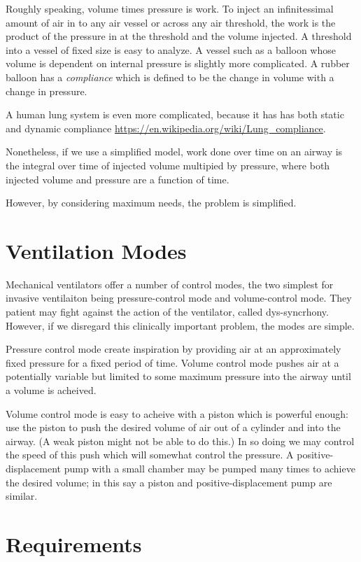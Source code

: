 \documentclass{article}
\begin{document}
Roughly speaking, volume times pressure is work.
To inject an infinitessimal amount of air in
to any air vessel or across any air threshold,
the work is the product of the pressure in at the threshold and the
volume injected.
A threshold into a vessel of fixed size is easy to analyze.
A vessel such as a balloon whose volume is dependent on internal pressure
is slightly more complicated.
A rubber balloon has a {\em compliance} which is defined to be
the change in volume with a change in pressure.

A human lung system is even more
complicated, because it has has
both static and dynamic compliance \url{https://en.wikipedia.org/wiki/Lung_compliance}.

Nonetheless, if we use a simplified model, work done over time
on an airway is the integral over time of injected volume
multipied by pressure, where both injected volume and
pressure are a function of time.

However, by considering maximum needs, the problem is simplified.

\section{Ventilation Modes}

Mechanical ventilators offer a number of control modes, the two
simplest for invasive ventilaiton
being pressure-control mode and volume-control mode.
They patient may fight against the action of the ventilator,
called dys-syncrhony. However, if we disregard this clinically
important problem, the modes are simple.

Pressure control mode create inspiration by providing air
at an approximately fixed pressure for a fixed period of time.
Volume control mode pushes air at a potentially variable but
limited to some maximum pressure into the airway until a volume
is acheived.

Volume control mode is easy to acheive with a piston which is
powerful enough: use the piston to push the desired volume of
air out of a cylinder and into the airway. (A weak piston might
not be able to do this.) In so doing we may control the speed
of this push which will somewhat control the pressure.
A positive-displacement pump with a small chamber may be pumped
many times to achieve the desired volume; in this say a
piston and positive-displacement pump are similar.

\section{Requirements}
\end{document}
